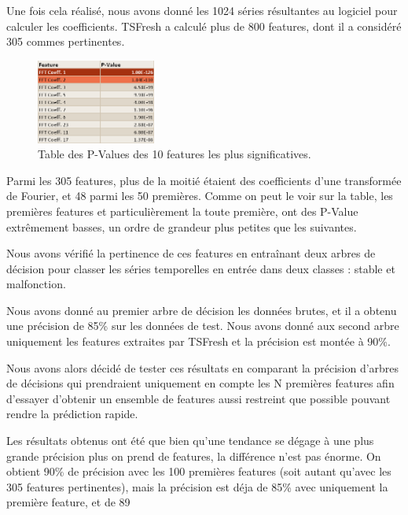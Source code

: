 \documentclass[french]{article}
\theoremstyle{mytheoremstyle}
\theoremstyle{mytheoremstyle}
\theoremstyle{myproblemstyle}
\begin{document}
        Une fois cela réalisé, nous avons donné les 1024 séries résultantes au logiciel pour calculer les coefficients. TSFresh a calculé plus de 800 features, dont il a considéré 305 commes pertinentes.
        
\begin{figure}[H]
            \centering
            \includegraphics[width=0.35\textwidth]{images/features_pvalue.png}
            \caption{Table des P-Values des 10 features les plus significatives.}
            \label{}
        \end{figure}

        Parmi les 305 features, plus de la moitié étaient des coefficients d'une transformée de Fourier, et 48 parmi les 50 premières. Comme on peut le voir sur la table, les premières features et particulièrement la toute première, ont des P-Value extrêmement basses, un ordre de grandeur plus petites que les suivantes.
        
        Nous avons vérifié la pertinence de ces features en entraînant deux arbres de décision pour classer les séries temporelles en entrée dans deux classes : stable et malfonction.
        
        Nous avons donné au premier arbre de décision les données brutes, et il a obtenu une précision de 85\% sur les données de test. Nous avons donné aux second arbre uniquement les features extraites par TSFresh et la précision est montée à 90\%.
        
        Nous avons alors décidé de tester ces résultats en comparant la précision d'arbres de décisions qui prendraient uniquement en compte les N premières features afin d'essayer d'obtenir un ensemble de features aussi restreint que possible pouvant rendre la prédiction rapide. 
        
        Les résultats obtenus ont été que bien qu'une tendance se dégage à une plus grande précision plus on prend de features, la différence n'est pas énorme. On obtient 90\% de précision avec les 100 premières features (soit autant qu'avec les 305 features pertinentes), mais la précision est déja de 85\% avec uniquement la première feature, et de  89%
        
\end{document}

